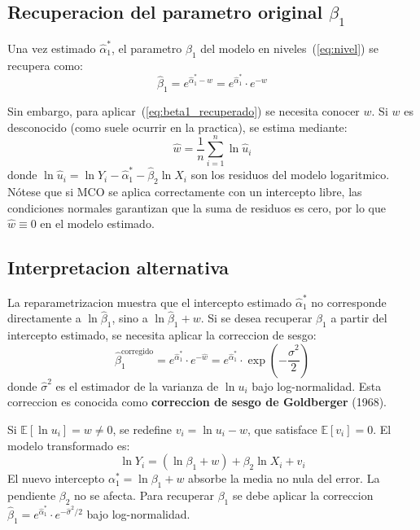 \documentclass[12pt, letterpaper]{article}
\theoremstyle{remark}
\newcommand{\E}{\mathbb{E}}
\begin{document}
\subsection{Recuperacion del parametro original $\beta_1$}

Una vez estimado $\hat\alpha_1^*$, el parametro $\beta_1$ del modelo en
niveles~(\ref{eq:nivel}) se recupera como:
\begin{equation}
  \hat\beta_1 = e^{\hat\alpha_1^* - w} = e^{\hat\alpha_1^*} \cdot e^{-w}
  \label{eq:beta1_recuperado}
\end{equation}

Sin embargo, para aplicar~(\ref{eq:beta1_recuperado}) se necesita conocer $w$.
Si $w$ es desconocido (como suele ocurrir en la practica), se estima mediante:
\begin{equation}
  \hat w = \frac{1}{n}\sum_{i=1}^n \ln\hat u_i
  \label{eq:w_estimado}
\end{equation}
donde $\ln\hat u_i = \ln Y_i - \hat\alpha_1^* - \hat\beta_2 \ln X_i$ son
los residuos del modelo logaritmico. Nótese que si MCO se aplica correctamente
con un intercepto libre, las condiciones normales garantizan que la suma de
residuos es cero, por lo que $\hat w \equiv 0$ en el modelo estimado.

\subsection{Interpretacion alternativa}

La reparametrizacion muestra que el intercepto estimado $\hat\alpha_1^*$
no corresponde directamente a $\ln\hat\beta_1$, sino a $\ln\hat\beta_1 + w$.
Si se desea recuperar $\beta_1$ a partir del intercepto estimado, se necesita
aplicar la correccion de sesgo:
\begin{equation}
  \hat\beta_1^{\text{corregido}}
    = e^{\hat\alpha_1^*} \cdot e^{-\hat w}
    = e^{\hat\alpha_1^*}
      \cdot \exp\!\left(-\frac{\hat\sigma^2}{2}\right)
  \label{eq:beta1_corregido}
\end{equation}
donde $\hat\sigma^2$ es el estimador de la varianza de $\ln u_i$ bajo log-normalidad.
Esta correccion es conocida como \textbf{correccion de sesgo de Goldberger} (1968).

\begin{clave}
  Si $\E[\ln u_i] = w \neq 0$, se redefine $v_i = \ln u_i - w$, que satisface
  $\E[v_i] = 0$. El modelo transformado es:
  \[
    \ln Y_i = (\ln\beta_1 + w) + \beta_2 \ln X_i + v_i
  \]
  El nuevo intercepto $\alpha_1^* = \ln\beta_1 + w$ absorbe la media no nula
  del error. La pendiente $\beta_2$ no se afecta. Para recuperar $\beta_1$
  se debe aplicar la correccion $\hat\beta_1 = e^{\hat\alpha_1^*} \cdot e^{-\hat\sigma^2/2}$
  bajo log-normalidad.
\end{clave}
\end{document}
